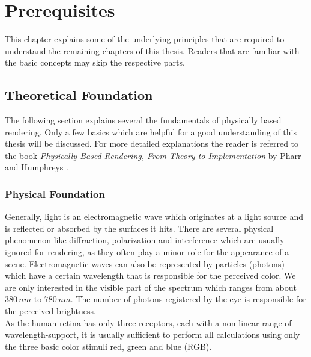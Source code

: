 \documentclass[thesis.tex]{subfiles}
\begin{document}
\chapter{Prerequisites}\label{chap:preq}
This chapter explains some of the underlying principles that are required to understand the remaining chapters of this thesis.
Readers that are familiar with the basic concepts may skip the respective parts.


\section{Theoretical Foundation} \label{sec:preq:theo}
The following section explains several the fundamentals of physically based rendering.
Only a few basics which are helpful for a good understanding of this thesis will be discussed.
For more detailed explanations the reader is referred to the book \emph{Physically Based Rendering, From Theory to Implementation} by Pharr and Humphreys \cite{bib:pbrt}.

\subsection{Physical Foundation}
Generally, light is an electromagnetic wave which originates at a light source and is reflected or absorbed by the surfaces it hits.
There are several physical phenomenon like diffraction, polarization and interference which are usually ignored for rendering, as they often play a minor role for the appearance of a scene.
Electromagnetic waves can also be represented by particles (photons) which have a certain wavelength that is responsible for the perceived color.
We are only interested in the visible part of the spectrum which ranges from about $380\,nm$ to $780\,nm$.
The number of photons registered by the eye is responsible for the perceived brightness.
\\
As the human retina has only three receptors, each with a non-linear range of wavelength-support, it is usually sufficient to perform all calculations using only the three basic color stimuli red, green and blue \cite{bib:colorscience} (RGB).
\end{document}
